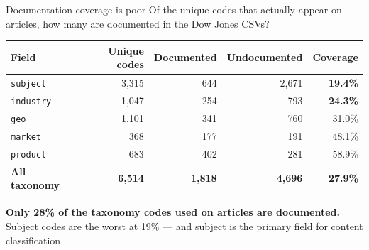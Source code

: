 \documentclass[10pt,aspectratio=169]{beamer}
\begin{document}
\begin{frame}{Documentation coverage is poor}
  \small
  Of the unique codes that actually appear on articles, how many are
  documented in the Dow Jones CSVs?

  \medskip
  \begin{tabular}{@{}lrrrr@{}}
    \toprule
    \textbf{Field} & \textbf{Unique codes} & \textbf{Documented} & \textbf{Undocumented} & \textbf{Coverage} \\
    \midrule
    \texttt{subject}  & 3,315 &   644 & 2,671 & \textcolor{YaleAccent}{\textbf{19.4\%}} \\
    \texttt{industry} & 1,047 &   254 &   793 & \textcolor{YaleAccent}{\textbf{24.3\%}} \\
    \texttt{geo}      & 1,101 &   341 &   760 & 31.0\% \\
    \texttt{market}   &   368 &   177 &   191 & 48.1\% \\
    \texttt{product}  &   683 &   402 &   281 & 58.9\% \\
    \midrule
    \textbf{All taxonomy} & \textbf{6,514} & \textbf{1,818} & \textbf{4,696} & \textbf{27.9\%} \\
    \bottomrule
  \end{tabular}

  \medskip
  \textbf{Only 28\% of the taxonomy codes used on articles are documented.}
  Subject codes are the worst at 19\% --- and subject is the primary field
  for content classification.

\end{frame}
\end{document}
